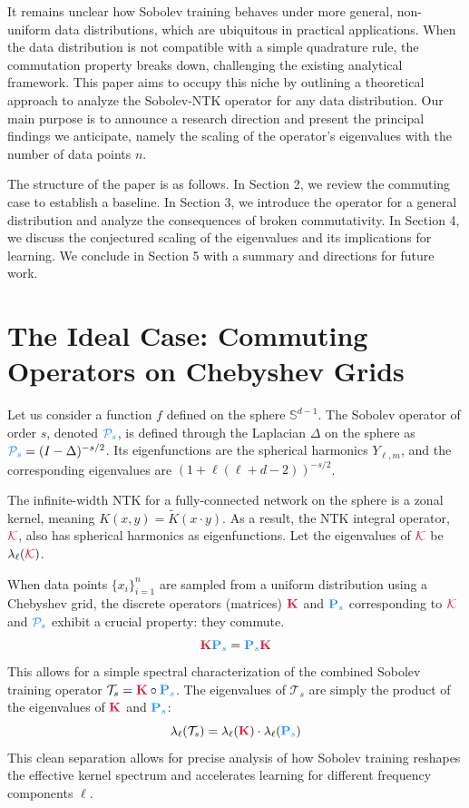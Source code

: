 \documentclass{article}
\newcommand{\K}{\textcolor{kernelcolor}{\mathbf{K}}}
\newcommand{\Ps}{\textcolor{sobolevcolor}{\mathbf{P}_s}}
\newcommand{\Kop}{\textcolor{kernelcolor}{\mathcal{K}}}
\newcommand{\Pop}{\textcolor{sobolevcolor}{\mathcal{P}_s}}
\newcommand{\Ts}{\mathcal{T}_s}
\newcommand{\Sphere}{\mathbb{S}^{d-1}}
\begin{document}
It remains unclear how Sobolev training behaves under more general, non-uniform data distributions, which are ubiquitous in practical applications. When the data distribution is not compatible with a simple quadrature rule, the commutation property breaks down, challenging the existing analytical framework. This paper aims to occupy this niche by outlining a theoretical approach to analyze the Sobolev-NTK operator for any data distribution. Our main purpose is to announce a research direction and present the principal findings we anticipate, namely the scaling of the operator's eigenvalues with the number of data points $n$.

The structure of the paper is as follows. In Section 2, we review the commuting case to establish a baseline. In Section 3, we introduce the operator for a general distribution and analyze the consequences of broken commutativity. In Section 4, we discuss the conjectured scaling of the eigenvalues and its implications for learning. We conclude in Section 5 with a summary and directions for future work.

\section{The Ideal Case: Commuting Operators on Chebyshev Grids}

Let us consider a function $f$ defined on the sphere $\Sphere$. The Sobolev operator of order $s$, denoted $\Pop$, is defined through the Laplacian $\Delta$ on the sphere as $\Pop = (I - \Delta)^{-s/2}$. Its eigenfunctions are the spherical harmonics $Y_{\ell, m}$, and the corresponding eigenvalues are $(1 + \ell(\ell+d-2))^{-s/2}$.

The infinite-width NTK for a fully-connected network on the sphere is a zonal kernel, meaning $K(x, y) = \tilde{K}(x \cdot y)$. As a result, the NTK integral operator, $\Kop$, also has spherical harmonics as eigenfunctions. Let the eigenvalues of $\Kop$ be $\lambda_\ell(\Kop)$.

When data points $\{x_i\}_{i=1}^n$ are sampled from a uniform distribution using a Chebyshev grid, the discrete operators (matrices) $\K$ and $\Ps$ corresponding to $\Kop$ and $\Pop$ exhibit a crucial property: they commute.
\begin{equation}
    \K \Ps = \Ps \K
\end{equation}
This allows for a simple spectral characterization of the combined Sobolev training operator $\Ts = \K \circ \Ps$. The eigenvalues of $\Ts$ are simply the product of the eigenvalues of $\K$ and $\Ps$:
\begin{equation}
    \lambda_{\ell}(\Ts) = \lambda_{\ell}(\K) \cdot \lambda_{\ell}(\Ps)
\end{equation}
This clean separation allows for precise analysis of how Sobolev training reshapes the effective kernel spectrum and accelerates learning for different frequency components $\ell$.
\end{document}
